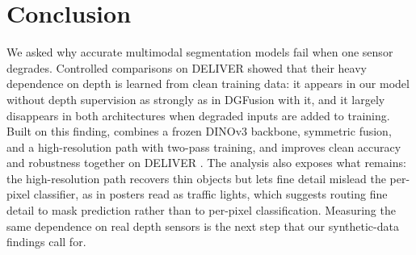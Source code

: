 \section{Conclusion}\label{sec:conclusion}
We asked why accurate multimodal segmentation models fail when one sensor degrades. Controlled comparisons on DELIVER showed that their heavy dependence on depth is learned from clean training data: it appears in our model without depth supervision as strongly as in DGFusion with it, and it largely disappears in both architectures when degraded inputs are added to training. Built on this finding, \ours{} combines a frozen DINOv3 backbone, symmetric fusion, and a high-resolution path with two-pass training, and improves clean accuracy and robustness together on DELIVER . The analysis also exposes what remains: the high-resolution path recovers thin objects but lets fine detail mislead the per-pixel classifier, as in posters read as traffic lights, which suggests routing fine detail to mask prediction rather than to per-pixel classification. Measuring the same dependence on real depth sensors is the next step that our synthetic-data findings call for.
